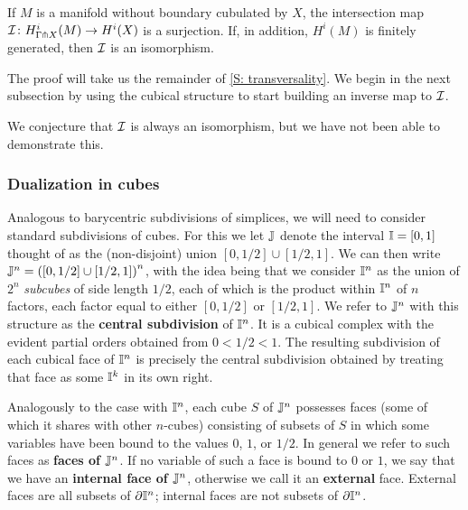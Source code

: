 \begin{theorem}\label{T: intersection qi}
	If $M$ is a manifold without boundary cubulated by $X$, the intersection map $\mathcal{I} \colon H^i_{\Gamma \pitchfork X}(M) \to H^i(X)$ is a surjection.
	If, in addition, $H^i(M)$ is finitely generated, then $\mathcal{I}$ is an isomorphism.
\end{theorem}

The proof will take us the remainder of \cref{S: transversality}.
We begin in the next subsection by using the cubical structure to start building an inverse map to $\mathcal{I}$.

We conjecture that $\mathcal{I}$ is always an isomorphism, but we have not been able to demonstrate this.

\subsubsection{Dualization in cubes}\label{S: dual cubes}

Analogous to barycentric subdivisions of simplices, we will need to consider standard subdivisions of cubes.
For this we let $\mathbb{J}$ denote the interval $\mathbb{I} = [0,1]$ thought of as the (non-disjoint) union $[0,1/2] \cup [1/2,1]$.
We can then write $\mathbb{J}^n = \left([0,1/2] \cup [1/2,1]\right)^n$, with the idea being that we consider $\mathbb{I}^n$ as the union of $2^n$ \textit{subcubes} of side length $1/2$, each of which is the product within $\mathbb{I}^n$ of $n$ factors, each factor equal to either $[0,1/2]$ or $[1/2,1]$.
We refer to $\mathbb{J}^n$ with this structure as the \textbf{central subdivision} of $\mathbb{I}^n$.
It is a cubical complex with the evident partial orders obtained from $0 < 1/2 < 1$.
The resulting subdivision of each cubical face of $\mathbb{I}^n$ is precisely the central subdivision obtained by treating that face as some $\mathbb{I}^k$ in its own right.

Analogously to the case with $\mathbb{I}^n$, each cube $S$ of $\mathbb{J}^n$ possesses faces (some of which it shares with other $n$-cubes) consisting of subsets of $S$ in which some variables have been bound to the values $0$, $1$, or $1/2$.
In general we refer to such faces as \textbf{faces of $\mathbb{J}^n$}.
If no variable of such a face is bound to $0$ or $1$, we say that we have an \textbf{internal face of $\mathbb{J}^n$}, otherwise we call it an \textbf{external} face.
External faces are all subsets of $\partial \mathbb{I}^n$; internal faces are not subsets of $\partial \mathbb{I}^n$.

